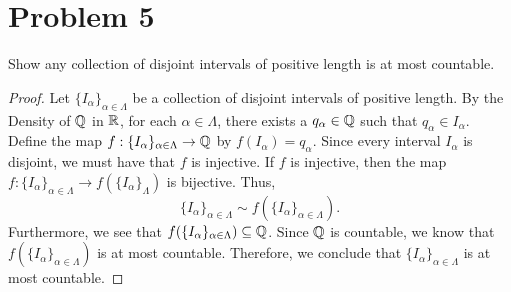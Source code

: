 \documentclass[11pt,a4paper]{article}
\begin{document}
\section*{Problem 5} Show any collection of disjoint intervals of positive length is at most countable.
\begin{proof}
    Let \( \{ {I}_{\alpha} \}_{\alpha \in \Lambda} \) be a collection of disjoint intervals of positive length. By the Density of \( \mathbb{Q}  \) in \( \mathbb{R}  \), for each \( \alpha \in \Lambda \), there exists a \( {q}_{\alpha} \in \mathbb{Q}  \) such that \( {q}_{\alpha} \in {I}_{\alpha} \). Define the map \( f: \{ {I}_{\alpha} \}_{\alpha \in \Lambda} \to \mathbb{Q}  \) by \( f({I}_{\alpha}) = {q}_{\alpha} \). Since every interval \( {I}_{\alpha} \) is disjoint, we must have that \( f  \) is injective. If \( f  \) is injective, then the map \( f: \{ {I}_{\alpha} \}_{\alpha \in \Lambda} \to f(\{ {I}_{\alpha} \}_{\Lambda}) \) is bijective. Thus, \[ \{ {I}_{\alpha} \}_{ \alpha \in \Lambda} \sim f(\{ {I}_{\alpha} \}_{ \alpha \in \Lambda}). \]
    Furthermore, we see that \( f(\{ {I}_{\alpha} \}_{\alpha \in \Lambda}) \subseteq  \mathbb{Q}  \). Since \( \mathbb{Q}  \) is countable, we know that \( f(\{ {I}_{\alpha} \}_{\alpha \in \Lambda}) \) is at most countable. Therefore, we conclude that \( \{ {I}_{\alpha} \}_{\alpha \in \Lambda} \) is at most countable.
\end{proof}
\end{document}
